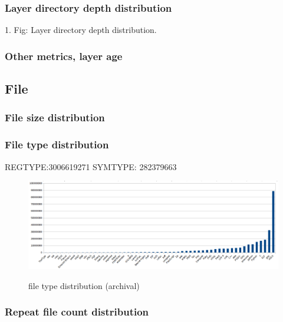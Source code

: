 \subsubsection{Layer directory depth distribution}

1. Fig: Layer directory depth distribution.


\subsubsection{Other metrics, layer age}

\subsection{File}


\subsubsection{File size distribution}

\subsubsection{File type distribution}

REGTYPE:3006619271
SYMTYPE: 282379663

\begin{figure}
	\centering
	\includegraphics[width=1\textwidth]{graphs/file_type.png}\\
	\caption{file type distribution (archival)}\label{xxx}
\end{figure}

\subsubsection{Repeat file count distribution}
